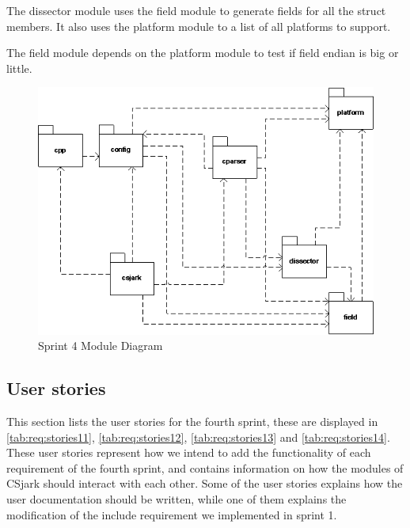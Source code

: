 The dissector module uses the field module to generate fields for all the 
struct members. It also uses the platform module to a list of all platforms
to support.

The field module depends on the platform module to test if field endian is big
or little.

\begin{figure}[htbp]
	\center
	\includegraphics[width=\textwidth]{./sprints/img/sp4modulediagram}
	\caption{Sprint 4 Module Diagram \label{fig:sp4module}}
\end{figure}

\subsection{User stories}
\label{sec:req:stories4}
This section lists the user stories for the fourth sprint, these are displayed in \autoref{tab:req:stories11}, \autoref{tab:req:stories12}, \autoref{tab:req:stories13} and \autoref{tab:req:stories14}.
These user stories represent how we intend to add the functionality of each requirement of the fourth sprint,
and contains information on how the modules of CSjark should interact with each other.
Some of the user stories explains how the user documentation should be written, while one of them explains the modification of the \gls{include} requirement we implemented in sprint 1.

